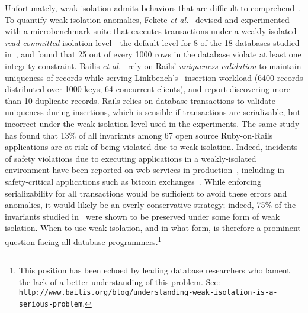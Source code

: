 Unfortunately, weak isolation admits behaviors that are difficult to
comprehend~\cite{berenson}. To quantify weak isolation anomalies,
Fekete \emph{et al.}~\cite{feketevldb09} devised and experimented with
a microbenchmark suite that executes transactions under a
weakly-isolated \emph{read committed} isolation level - the default
level for 8 of the 18 databases studied in~\cite{bailishotos}, and
found that 25 out of every 1000 rows in the database violate at least
one integrity constraint. Bailis \emph{et al.}~\cite{bailisferal} rely
on Rails' \emph{uniqueness validation} to maintain uniqueness of
records while serving Linkbench's~\cite{linkbench} insertion workload
(6400 records distributed over 1000 keys; 64 concurrent clients), and
report discovering more than 10 duplicate records.  Rails relies on
database transactions to validate uniqueness during insertions, which
is sensible if transactions are serializable, but incorrect under the
weak isolation level used in the experiments. The same study has found
that 13\% of all invariants among 67 open source Ruby-on-Rails
applications are at risk of being violated due to weak
isolation. Indeed, incidents of safety violations due to executing
applications in a weakly-isolated environment have been reported on
web services in production~\cite{starbucksbug, scimedbug}, including
in safety-critical applications such as bitcoin
exchanges~\cite{poloniexbug, bitcoinbug}. While enforcing
serializability for all transactions would be sufficient to avoid
these errors and anomalies, it would likely be an overly conservative
strategy; indeed, 75\% of the invariants studied in~\cite{bailisferal}
were shown to be preserved under some form of weak isolation.  When to
use weak isolation, and in what form, is therefore a prominent
question facing all database programmers.\footnote{This position has
  been echoed by leading database researchers who lament the lack of a
  better understanding of this problem.  See: {\tt
    http://www.bailis.org/blog/understanding-weak-isolation-is-a-serious-problem}.}

